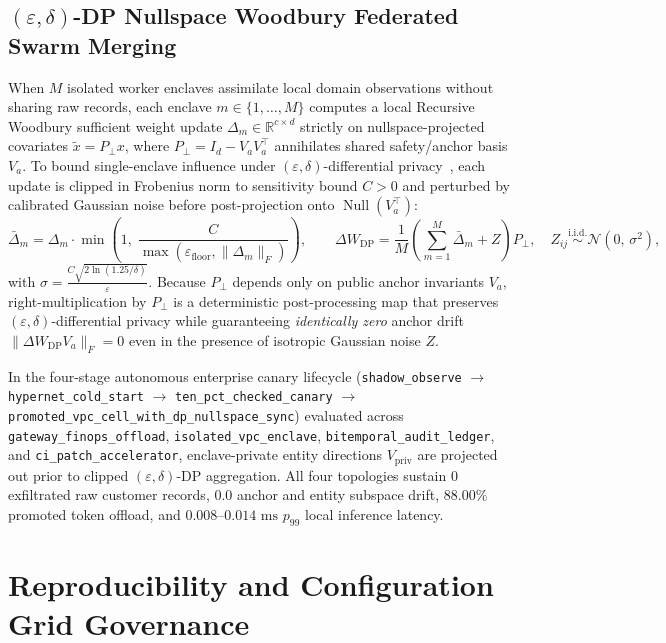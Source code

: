 \documentclass[11pt,a4paper]{article}
\begin{document}
\subsection{$(\varepsilon, \delta)$-DP Nullspace Woodbury Federated Swarm Merging}
When $M$ isolated worker enclaves assimilate local domain observations without sharing raw records, each enclave $m \in \{1,\dots,M\}$ computes a local Recursive Woodbury sufficient weight update $\Delta_m \in \mathbb{R}^{c \times d}$ strictly on nullspace-projected covariates $\tilde{x} = P_\perp x$, where $P_\perp = I_d - V_a V_a^\top$ annihilates shared safety/anchor basis $V_a$. To bound single-enclave influence under $(\varepsilon, \delta)$-differential privacy~\cite{dwork2014algorithmic}, each update is clipped in Frobenius norm to sensitivity bound $C > 0$ and perturbed by calibrated Gaussian noise before post-projection onto $\operatorname{Null}(V_a^\top)$:
\begin{equation}
\bar{\Delta}_m = \Delta_m \cdot \min\!\left(1,\; \frac{C}{\max(\varepsilon_{\text{floor}}, \|\Delta_m\|_F)}\right), \qquad
\Delta W_{\text{DP}} = \frac{1}{M}\!\left(\sum_{m=1}^{M} \bar{\Delta}_m + Z\right) P_\perp, \quad Z_{ij} \stackrel{\text{i.i.d.}}{\sim} \mathcal{N}\!\left(0,\, \sigma^2\right),
\end{equation}
with $\sigma = \frac{C \sqrt{2 \ln(1.25 / \delta)}}{\varepsilon}$. Because $P_\perp$ depends only on public anchor invariants $V_a$, right-multiplication by $P_\perp$ is a deterministic post-processing map that preserves $(\varepsilon, \delta)$-differential privacy while guaranteeing \emph{identically zero} anchor drift $\|\Delta W_{\text{DP}} V_a\|_F = 0$ even in the presence of isotropic Gaussian noise $Z$.

In the four-stage autonomous enterprise canary lifecycle (\texttt{shadow\_observe} $\to$ \texttt{hypernet\_cold\_start} $\to$ \texttt{ten\_pct\_checked\_canary} $\to$ \texttt{promoted\_vpc\_cell\_with\_dp\_nullspace\_sync}) evaluated across \texttt{gateway\_finops\_offload}, \texttt{isolated\_vpc\_enclave}, \texttt{bitemporal\_audit\_ledger}, and \texttt{ci\_patch\_accelerator}, enclave-private entity directions $V_{\text{priv}}$ are projected out prior to clipped $(\varepsilon, \delta)$-DP aggregation. All four topologies sustain $0$ exfiltrated raw customer records, $0.0$ anchor and entity subspace drift, $88.00\%$ promoted token offload, and $0.008\text{--}0.014\text{ ms}$ $p_{99}$ local inference latency.

\section{Reproducibility and Configuration Grid Governance}
\end{document}
